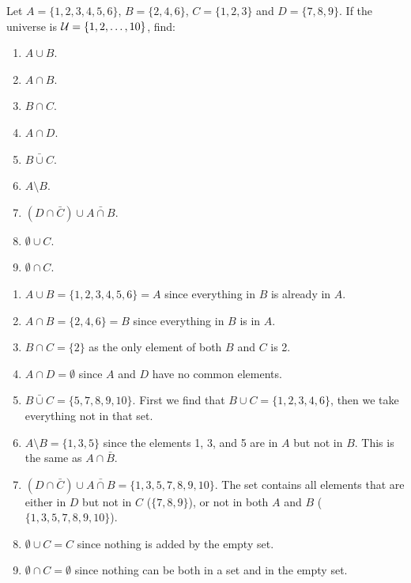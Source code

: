 \documentclass[12pt]{article}
\begin{document}
\begin{example}
 Let $A = \{1, 2, 3, 4, 5, 6\}$, $B = \{2, 4, 6\}$, $C = \{1, 2, 3\}$ and $D = \{7, 8, 9\}$.  If the universe is $\mathcal U = \{1, 2, \ldots, 10\}$,  find:
\begin{multicols}{3}
 \begin{enumerate}
  \item $A \cup B$.
\item $A \cap B$.
\item $B \cap C$.
\item $A \cap D$.
\item $\bar{B \cup C}$.
\item $A \setminus B$.
\item $(D \cap \bar C) \cup \bar{A \cap B}$.
\item $\emptyset \cup C$.
\item $\emptyset \cap C$.
 \end{enumerate}
\end{multicols}

\clearpage

\begin{solution}
  \begin{enumerate}
  \item $A \cup B = \{1, 2, 3, 4, 5, 6\} = A$ since everything in $B$ is already in $A$.
\item $A \cap B = \{2, 4, 6\} = B$ since everything in $B$ is in $A$.
\item $B \cap C = \{2\}$ as the only element of both $B$ and $C$ is 2.
\item $A \cap D = \emptyset$ since $A$ and $D$ have no common elements.
\item $\bar{B \cup C} = \{5, 7, 8, 9, 10\}$.  First we find that $B \cup C = \{1, 2, 3, 4, 6\}$, then we take everything not in that set.
\item $A \setminus B = \{1, 3, 5\}$ since the elements 1, 3, and 5 are in $A$ but not in $B$.  This is the same as $A \cap \bar B$.
\item $(D \cap \bar C) \cup \bar{A \cap B} = \{1, 3, 5, 7, 8, 9, 10\}.$ The set contains all elements that are either in $D$ but not in $C$ ($\{7,8,9\}$), or not in both $A$ and $B$ ($\{1,3,5,7,8,9,10\}$).
\item $\emptyset \cup C = C$ since nothing is added by the empty set.
\item $\emptyset \cap C = \emptyset$ since nothing can be both in a set and in the empty set.
 \end{enumerate}
\end{solution}
\end{example}
\end{document}
